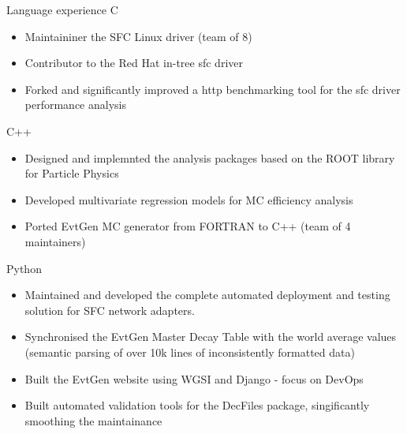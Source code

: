 \documentclass{format/resume} %
\begin{document}
\begin{rSection}{Language experience}
C
\begin{itemize}
\item Maintaininer the SFC Linux driver (team of 8)
\item Contributor to the Red Hat in-tree sfc driver
\item Forked and significantly improved a http benchmarking tool for the sfc driver performance analysis
\end{itemize}
C++
\begin{itemize}
\item Designed and implemnted the analysis packages based on the ROOT library for Particle Physics
\item Developed multivariate regression models for MC efficiency analysis
\item Ported EvtGen MC generator from FORTRAN to C++ (team of 4 maintainers)
\end{itemize}
Python
\begin{itemize}
\item Maintained and developed the complete automated deployment and testing solution for SFC network adapters. 
\item Synchronised the EvtGen Master Decay Table with the world average values (semantic parsing of over 10k lines of inconsistently formatted data)
\item Built the EvtGen website using WGSI and Django - focus on DevOps
\item Built automated validation tools for the DecFiles package, singificantly smoothing the maintainance 
\end{itemize}
\end{rSection}
\end{document}
